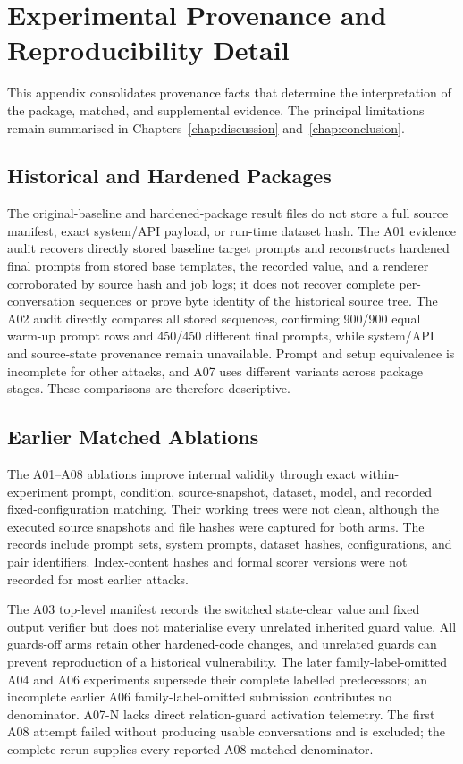 \chapter{Experimental Provenance and Reproducibility Detail}
\label{app:provenance-detail}

This appendix consolidates provenance facts that determine the interpretation of the package, matched, and supplemental evidence. The principal limitations remain summarised in Chapters~\ref{chap:discussion} and~\ref{chap:conclusion}.

\section{Historical and Hardened Packages}

The original-baseline and hardened-package result files do not store a full source manifest, exact system/API payload, or run-time dataset hash. The A01 evidence audit recovers directly stored baseline target prompts and reconstructs hardened final prompts from stored base templates, the recorded  value, and a renderer corroborated by source hash and job logs; it does not recover complete per-conversation sequences or prove byte identity of the historical source tree. The A02 audit directly compares all stored  sequences, confirming 900/900 equal warm-up prompt rows and 450/450 different final prompts, while system/API and source-state provenance remain unavailable. Prompt and setup equivalence is incomplete for other attacks, and A07 uses different variants across package stages. These comparisons are therefore descriptive.

\section{Earlier Matched Ablations}

The A01--A08 ablations improve internal validity through exact within-experiment prompt, condition, source-snapshot, dataset, model, and recorded fixed-configuration matching. Their working trees were not clean, although the executed source snapshots and file hashes were captured for both arms. The records include prompt sets, system prompts, dataset hashes, configurations, and pair identifiers. Index-content hashes and formal scorer versions were not recorded for most earlier attacks.

The A03 top-level manifest records the switched state-clear value and fixed output verifier but does not materialise every unrelated inherited guard value. All guards-off arms retain other hardened-code changes, and unrelated guards can prevent reproduction of a historical vulnerability. The later family-label-omitted A04 and A06 experiments supersede their complete labelled predecessors; an incomplete earlier A06 family-label-omitted submission contributes no denominator. \mbox{A07-N} lacks direct relation-guard activation telemetry. The first A08 attempt failed without producing usable conversations and is excluded; the complete rerun supplies every reported A08 matched denominator.

